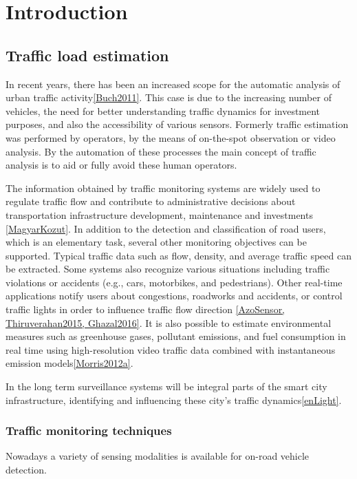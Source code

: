 \chapter*{Introduction}
\section{Traffic load estimation}
In recent years, there has been an increased scope for the automatic analysis of urban traffic activity\ref{Buch2011}.
This case is due to the increasing number of vehicles, the need for better understanding traffic dynamics for investment purposes, and also the accessibility of various sensors.
Formerly traffic estimation was performed by operators, by the means of on-the-spot observation or video analysis.
By the automation of these processes the main concept of traffic analysis is to aid or fully avoid these human operators.

The information obtained by traffic monitoring systems are widely used to regulate traffic flow and contribute to administrative decisions about transportation infrastructure development, maintenance and investments \ref{MagyarKozut}.
In addition to the detection and classification of road users, which is an elementary task, several other monitoring objectives can be supported. 
Typical traffic data such as flow, density, and average traffic speed can be extracted.
Some systems also recognize various situations including traffic violations or accidents (e.g., cars, motorbikes, and pedestrians).
Other real-time applications notify users about congestions, roadworks and accidents, or control traffic lights in order to influence traffic flow direction \ref{AzoSensor, Thiruverahan2015, Ghazal2016}.
It is also possible to estimate environmental measures such as greenhouse gases, pollutant emissions, and fuel consumption in real time using high-resolution video traffic data combined with instantaneous emission models\ref{Morris2012a}. 

In the long term surveillance systems will be integral parts of the smart city infrastructure, identifying and influencing these city's traffic dynamics\ref{enLight}.

\subsection{Traffic monitoring techniques}
Nowadays a variety of sensing modalities is available for on-road vehicle detection.

